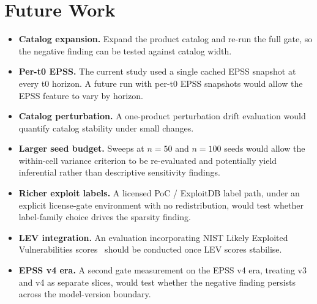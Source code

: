 \section{Future Work}
\begin{itemize}
  \item \textbf{Catalog expansion.} Expand the product catalog and re-run the full gate, so the negative finding can be tested against catalog width.
  \item \textbf{Per-t0 EPSS.} The current study used a single cached EPSS snapshot at every t0 horizon. A future run with per-t0 EPSS snapshots would allow the EPSS feature to vary by horizon.
  \item \textbf{Catalog perturbation.} A one-product perturbation drift evaluation would quantify catalog stability under small changes.
  \item \textbf{Larger seed budget.} Sweeps at $n = 50$ and $n = 100$ seeds would allow the within-cell variance criterion to be re-evaluated and potentially yield inferential rather than descriptive sensitivity findings.
  \item \textbf{Richer exploit labels.} A licensed PoC / ExploitDB label path, under an explicit license-gate environment with no redistribution, would test whether label-family choice drives the sparsity finding.
  \item \textbf{LEV integration.} An evaluation incorporating NIST Likely Exploited Vulnerabilities scores~\cite{MellSpring2025NISTLEV} should be conducted once LEV scores stabilise.
  \item \textbf{EPSS v4 era.} A second gate measurement on the EPSS v4 era, treating v3 and v4 as separate slices, would test whether the negative finding persists across the model-version boundary.
\end{itemize}
